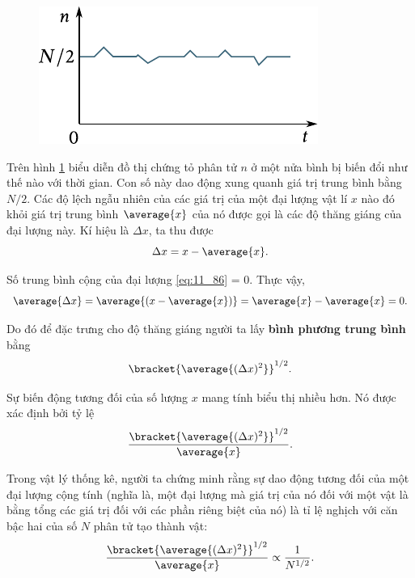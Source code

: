 \begin{figure}[!htb]
	\begin{center}
		\includegraphics[scale=1.0]{figures/ch_11/fig_11_25.pdf}
		\caption[]{}
		\label{fig:11_25}
	\end{center}
	\vspace{-0.8cm}
\end{figure}

Trên hình \ref{fig:11_25} biểu diễn đồ thị chứng tỏ phân tử     $n$ ở một nửa bình bị biến đổi như thế nào với thời gian. Con số này dao động xung quanh giá trị trung bình bằng $N/2$. Các độ lệch ngẫu nhiên của các giá trị của một đại lượng vật lí $x$ nào đó khỏi giá trị trung bình $\average{x}$ của nó được gọi là các độ thăng giáng của đại lượng này. Kí hiệu là $\Delta x$, ta thu được
\begin{equation}\label{eq:11_86}
	\Delta x = x - \average{x}.
\end{equation}

\noindent
Số trung bình cộng của đại lượng \eqref{eq:11_86} = $0$. Thực vậy,
\begin{equation*}
	\average{\Delta x} = \average{(x - \average{x})} = \average{x} - \average{x} = 0.
\end{equation*}

\noindent
Do đó để đặc trưng cho độ thăng giáng người ta lấy \textbf{bình phương trung bình} bằng
\begin{equation}\label{eq:11_87}
	\bracket{\average{(\Delta x)^2}}^{1/2}.
\end{equation}

Sự biến động tương đối của số lượng $x$ mang tính biểu thị nhiều hơn. Nó được xác định bởi tỷ lệ
\begin{equation}\label{eq:11_88}
	\frac{\bracket{\average{(\Delta x)^2}}^{1/2}}{\average{x}}.
\end{equation}

Trong vật lý thống kê, người ta chứng minh rằng sự dao động tương đối của một đại lượng cộng tính (nghĩa là, một đại lượng mà giá trị của nó đối với một vật là bằng tổng các giá trị đối với các phần riêng biệt của nó) là tỉ lệ nghịch với căn bậc hai của số $N$ phân tử tạo thành vật:
\begin{equation}\label{công thức:11_89}
	\frac{\bracket{\average{(\Delta x)^2}}^{1/2}}{\average{x}} \propto \frac{1}{N^{1/2}}.
\end{equation}

